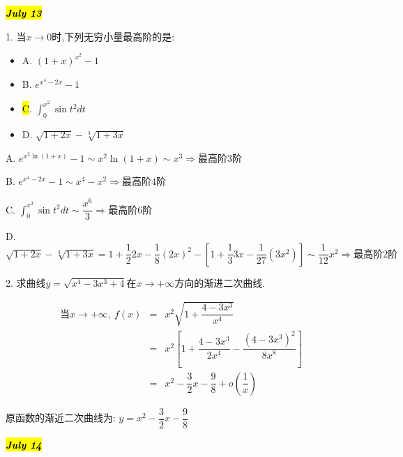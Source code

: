 \hl{\textbf{\textit{July 13}}}

1. 当$x\rightarrow 0$时,下列无穷小量最高阶的是: 
\begin{itemize}
	\item A. $(1+x)^{x^2}-1$
	\item B. $e^{x^4-2x}-1$
	\item \hl{C}. $\int_{0}^{x^2}\sin t^2dt$
	\item D. $\sqrt{1+2x}-\sqrt[3]{1+3x}$
\end{itemize}
\begin{solution}
	
	A. $e^{x^2\ln(1+x)}-1\sim x^2\ln(1+x)\sim x^3\Rightarrow \text{最高阶} 3\text{阶}$
	
	B. $e^{x^4-2x}-1\sim x^4-x^2\Rightarrow \text{最高阶} 4\text{阶}$
	
	C. $\int_{0}^{x^2}\sin t^2dt\sim \dfrac{x^6}{3}\Rightarrow \text{最高阶} 6\text{阶}$
	
	D. $\sqrt{1+2x}-\sqrt[3]{1+3x}=1+\dfrac{1}{2}2x-\dfrac{1}{8}(2x)^2-[1+\dfrac{1}{3}3x-\dfrac{1}{27}(3x^2)]\sim \dfrac{1}{12}x^2\Rightarrow \text{最高阶} 2\text{阶}$
\end{solution}

2. 求曲线$y=\sqrt{x^4-3x^3+4}$在$x\rightarrow +\infty$方向的渐进二次曲线.
\begin{solution}
	\begin{eqnarray*}
		\text{当}x\rightarrow +\infty,\ f(x)&=&x^2\sqrt{1+\dfrac{4-3x^3}{x^4}}\\
		&=&x^2[1+\dfrac{4-3x^3}{2x^4}-\dfrac{(4-3x^3)^2}{8x^8}]\\
		&=&x^2-\dfrac{3}{2}x-\dfrac{9}{8}+o(\dfrac{1}{x})
	\end{eqnarray*}
	
	原函数的渐近二次曲线为: $y=x^2-\dfrac{3}{2}x-\dfrac{9}{8}$
\end{solution}

\hl{\textbf{\textit{July 14}}}

